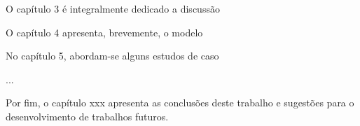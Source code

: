 O capítulo 3 é integralmente dedicado a discussão %

O capítulo 4 apresenta, brevemente, o modelo %

No capítulo 5, abordam-se alguns estudos de caso %

...

Por fim, o capítulo xxx apresenta as conclusões deste trabalho e sugestões para o desenvolvimento de trabalhos futuros.








